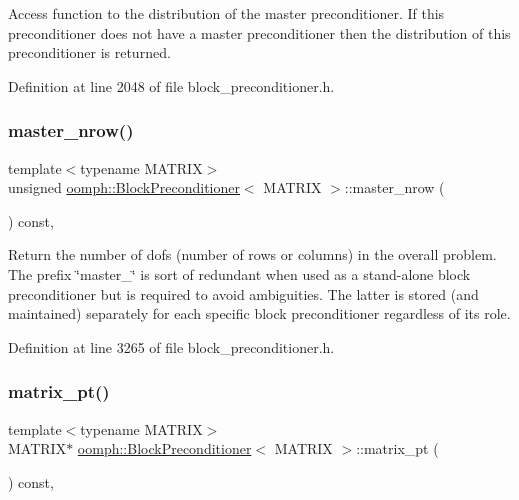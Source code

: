 Access function to the distribution of the master preconditioner. If this preconditioner does not have a master preconditioner then the distribution of this preconditioner is returned. 



Definition at line 2048 of file block\+\_\+preconditioner.\+h.

\mbox{\label{classoomph_1_1BlockPreconditioner_a3e5b553f65e6c25354a5c908d507e8ee}} 
\subsubsection{\texorpdfstring{master\+\_\+nrow()}{master\_nrow()}}
{\footnotesize\ttfamily template$<$typename M\+A\+T\+R\+IX$>$ \\
unsigned \hyperlink{classoomph_1_1BlockPreconditioner}{oomph\+::\+Block\+Preconditioner}$<$ M\+A\+T\+R\+IX $>$\+::master\+\_\+nrow (\begin{DoxyParamCaption}{ }\end{DoxyParamCaption}) const\hspace{0.3cm}{\ttfamily [inline]}, {\ttfamily [protected]}}



Return the number of dofs (number of rows or columns) in the overall problem. The prefix \char`\"{}master\+\_\+\char`\"{} is sort of redundant when used as a stand-\/alone block preconditioner but is required to avoid ambiguities. The latter is stored (and maintained) separately for each specific block preconditioner regardless of its role. 



Definition at line 3265 of file block\+\_\+preconditioner.\+h.

\mbox{\label{classoomph_1_1BlockPreconditioner_a9aac48fd53e579e6db8eeed58933a14b}} 
\subsubsection{\texorpdfstring{matrix\+\_\+pt()}{matrix\_pt()}}
{\footnotesize\ttfamily template$<$typename M\+A\+T\+R\+IX$>$ \\
M\+A\+T\+R\+IX$\ast$ \hyperlink{classoomph_1_1BlockPreconditioner}{oomph\+::\+Block\+Preconditioner}$<$ M\+A\+T\+R\+IX $>$\+::matrix\+\_\+pt (\begin{DoxyParamCaption}{ }\end{DoxyParamCaption}) const\hspace{0.3cm}{\ttfamily [inline]}, {\ttfamily [virtual]}}



